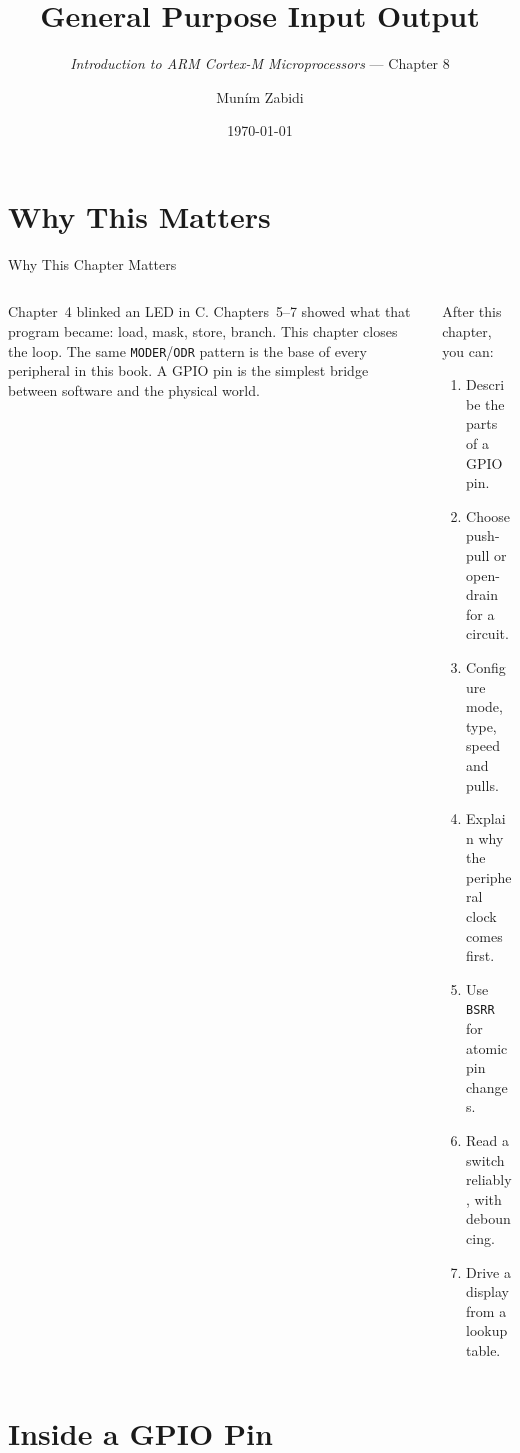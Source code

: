 \documentclass[9pt,aspectratio=169,xcolor=table]{beamer}
\title{General Purpose Input Output}
\subtitle{\emph{Introduction to ARM Cortex-M Microprocessors} --- Chapter 8}
\author{Mun\'{i}m Zabidi}
\institute{\color{primary}Faculty of Electrical Engineering, Universiti Teknologi Malaysia}
\date{\today}
\begin{document}
\titlepage

\section{Why This Matters}

\begin{frame}{Why This Chapter Matters}
    \begin{columns}[T]
    \begin{column}{.47\textwidth}
        {\normalsize Chapter~4 blinked an LED in C. Chapters~5--7 showed what that program became: load, mask, store, branch. This chapter closes the loop. The same \texttt{MODER}/\texttt{ODR} pattern is the base of every peripheral in this book. A GPIO pin is the simplest bridge between software and the physical world.}
    \end{column}
    \begin{column}{.51\textwidth}
        \begin{block}{After this chapter, you can:}
        {\small
        \begin{enumerate}\itemsep2pt
            \item Describe the parts of a GPIO pin.
            \item Choose push-pull or open-drain for a circuit.
            \item Configure mode, type, speed and pulls.
            \item Explain why the peripheral clock comes first.
            \item Use \texttt{BSRR} for atomic pin changes.
            \item Read a switch reliably, with debouncing.
            \item Drive a display from a lookup table.
        \end{enumerate}}
        \end{block}
    \end{column}
    \end{columns}
\end{frame}


\section{Inside a GPIO Pin}
\end{document}
